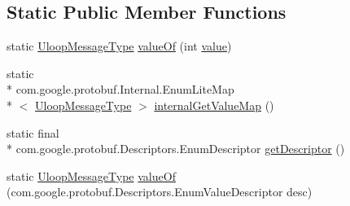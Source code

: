 \subsection*{Static Public Member Functions}
\begin{DoxyCompactItemize}
\item 
static \hyperlink{enumeu_1_1uloop_1_1messages_1_1UloopMessages_1_1UloopMessageType}{Uloop\+Message\+Type} \hyperlink{enumeu_1_1uloop_1_1messages_1_1UloopMessages_1_1UloopMessageType_aba3200220ef915b16ae861d0e8a0c246}{value\+Of} (int \hyperlink{enumeu_1_1uloop_1_1messages_1_1UloopMessages_1_1UloopMessageType_a757996108c5d548bcfaf69a86a385761}{value})
\item 
static \\*
com.\+google.\+protobuf.\+Internal.\+Enum\+Lite\+Map\\*
$<$ \hyperlink{enumeu_1_1uloop_1_1messages_1_1UloopMessages_1_1UloopMessageType}{Uloop\+Message\+Type} $>$ \hyperlink{enumeu_1_1uloop_1_1messages_1_1UloopMessages_1_1UloopMessageType_a541a8409b2646f6b3974bb2c9147cef9}{internal\+Get\+Value\+Map} ()
\item 
static final \\*
com.\+google.\+protobuf.\+Descriptors.\+Enum\+Descriptor \hyperlink{enumeu_1_1uloop_1_1messages_1_1UloopMessages_1_1UloopMessageType_ae4788dc7a3795c2952f170dd243e5d0c}{get\+Descriptor} ()
\item 
static \hyperlink{enumeu_1_1uloop_1_1messages_1_1UloopMessages_1_1UloopMessageType}{Uloop\+Message\+Type} \hyperlink{enumeu_1_1uloop_1_1messages_1_1UloopMessages_1_1UloopMessageType_a0158c3665518e84498cc3947b2ba89ab}{value\+Of} (com.\+google.\+protobuf.\+Descriptors.\+Enum\+Value\+Descriptor desc)
\end{DoxyCompactItemize}
